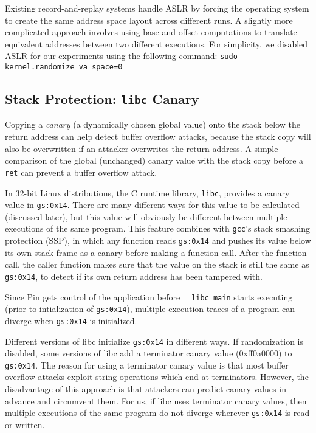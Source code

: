 Existing record-and-replay systems handle ASLR by
forcing the operating system to create the same address space layout across
different runs. A slightly more complicated approach involves
using base-and-offset computations to translate equivalent 
addresses between two different executions. For simplicity,
we disabled ASLR for our experiments using the following command:
\texttt {sudo kernel.randomize\_va\_space=0}

\subsection{Stack Protection: \texttt{libc} Canary} 
Copying a \emph{canary} (a dynamically chosen global value) onto the stack below the return
address can help detect buffer overflow attacks, because 
the stack copy will also be overwritten if an attacker overwrites
the return address. A simple comparison of the global (unchanged) canary
value with the stack copy before a \texttt{ret} can prevent a buffer overflow attack.

In 32-bit Linux distributions, the C runtime library, 
\texttt{libc}, provides a canary value in \texttt{gs:0x14}.
There are many different ways for this value to be calculated (discussed later), but this 
value will obviously be different between multiple executions of the same program.  This 
feature combines with \texttt{gcc}'s stack smashing protection (SSP), in which
any function reads \texttt{gs:0x14} and pushes its value below its own stack frame as a canary
before making a function call.
After the function call, the caller function makes sure that the value on the stack is
still the same as \texttt{gs:0x14}, to detect if its own return address has been tampered with. 

Since Pin gets control of the application before \texttt{\_\_libc\_main} starts executing (prior to
intialization of \texttt{gs:0x14}), multiple execution traces of a program
can diverge when \texttt{gs:0x14} is initialized. 

Different versions of libc initialize \texttt{gs:0x14} in different ways. If randomization
is disabled, some versions of libc add a terminator canary value (0xff0a0000)
to \texttt{gs:0x14}. The reason for using a terminator canary value
is that most buffer overflow attacks exploit string operations which end at
terminators. However, the disadvantage of this approach 
is that attackers can predict canary values in advance and circumvent them.
For us, if libc uses terminator canary values, then multiple executions of
the same program do not diverge wherever \texttt{gs:0x14} is read or written.

